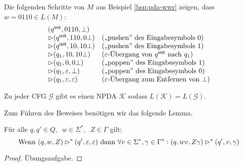 \begin{Bsp*}
  Die folgenden Schritte von $M$ aus Beispiel \ref{bsp:pda-wwr} zeigen, dass $w = 0110 \in L(M)$:
  \begin{displaymath}
  \begin{array}{ll}
    (q^\mathsf{init}, 0110, \bot) \\
    \rhd (q^\mathsf{init}, 110, 0\bot)  &\text{(,,pushen'' des Eingabesymbols $0$)}\\
    \rhd (q^\mathsf{init}, 10, 10\bot)  &\text{(,,pushen'' des Eingabesymbols $1$)}\\
    \rhd (q_1, 10, 10\bot)  &\text{($\varepsilon$-Übergang von $q^\mathsf{init}$ nach $q_1$)} \\
    \rhd (q_1, 0, 0\bot)  &\text{(,,poppen'' des Eingabesymbols $1$)}\\
    \rhd (q_1,\varepsilon, \bot) &\text{(,,poppen'' des Eingabesymbols $0$)}\\
    \rhd (q_1, \varepsilon, \varepsilon) &\text{($\varepsilon$-Übergang zum Entfernen von $\bot$)}
  \end{array}
\end{displaymath}
\end{Bsp*}

\begin{lemma}\label{lem:4.cfgToNpda}
 Zu jeder CFG $\mathcal{G}$ gibt es einen NPDA $\mathcal{K}$ sodass $L(\mathcal{K})=L(\mathcal{G})$.
\end{lemma}

  Zum Führen des Beweises benötigen wir das folgende Lemma.

\begin{lemma}\label{lem:4.mehrKeller}
Für alle $q,q' \in Q,\enspace w \in \Sigma^*,\enspace Z \in \Gamma$ gilt:
  \begin{displaymath}
    \text{Wenn } (q,w,Z) \rhd^* (q', \varepsilon, \varepsilon) \text{ dann } \forall v \in \Sigma^*, \gamma \in \Gamma^*: (q, wv, Z\gamma) \rhd^* (q', v, \gamma)
  \end{displaymath}
\end{lemma}
\begin{proof}
Übungsaufgabe.
\end{proof}


